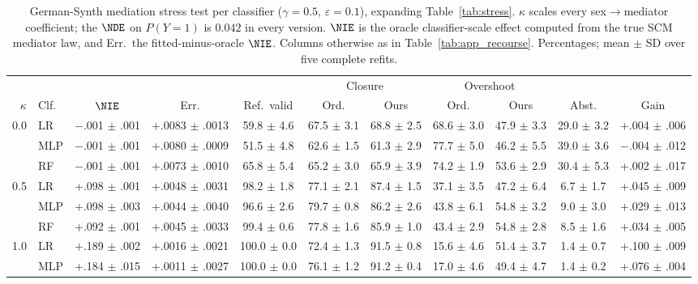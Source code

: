 \begin{table}[t]
\centering
\footnotesize
\caption{German-Synth mediation stress test per classifier ($\gamma=0.5$,
$\varepsilon=0.1$), expanding Table~\ref{tab:stress}. $\kappa$ scales every
sex$\to$mediator coefficient; the $\NDE$ on $P(Y=1)$ is $0.042$ in every
version. $\NIE$ is the oracle classifier-scale effect computed from the true
SCM mediator law, and Err.\ the fitted-minus-oracle $\NIE$. Columns otherwise
as in Table~\ref{tab:app_recourse}. Percentages; mean $\pm$ SD over five
complete refits.}
\label{tab:app_stress}
\setlength{\tabcolsep}{2.5pt}
\begin{tabular}{rl cc c cc cc c c}
\hline
& & & & & \multicolumn{2}{c}{Closure} & \multicolumn{2}{c}{Overshoot} & & \\
$\kappa$ & Clf. & $\NIE$ & Err. & Ref.\ valid & Ord. & Ours & Ord. & Ours &
Abst. & Gain \\
\hline
0.0 & LR & $-$.001 $\pm$ .001 & +.0083 $\pm$ .0013 & 59.8 $\pm$ 4.6 & 67.5 $\pm$ 3.1 & 68.8 $\pm$ 2.5 & 68.6 $\pm$ 3.0 & 47.9 $\pm$ 3.3 & 29.0 $\pm$ 3.2 & +.004 $\pm$ .006 \\
 & MLP & $-$.001 $\pm$ .001 & +.0080 $\pm$ .0009 & 51.5 $\pm$ 4.8 & 62.6 $\pm$ 1.5 & 61.3 $\pm$ 2.9 & 77.7 $\pm$ 5.0 & 46.2 $\pm$ 5.5 & 39.0 $\pm$ 3.6 & $-$.004 $\pm$ .012 \\
 & RF & $-$.001 $\pm$ .001 & +.0073 $\pm$ .0010 & 65.8 $\pm$ 5.4 & 65.2 $\pm$ 3.0 & 65.9 $\pm$ 3.9 & 74.2 $\pm$ 1.9 & 53.6 $\pm$ 2.9 & 30.4 $\pm$ 5.3 & +.002 $\pm$ .017 \\
\hline
0.5 & LR & +.098 $\pm$ .001 & +.0048 $\pm$ .0031 & 98.2 $\pm$ 1.8 & 77.1 $\pm$ 2.1 & 87.4 $\pm$ 1.5 & 37.1 $\pm$ 3.5 & 47.2 $\pm$ 6.4 & 6.7 $\pm$ 1.7 & +.045 $\pm$ .009 \\
 & MLP & +.098 $\pm$ .003 & +.0044 $\pm$ .0040 & 96.6 $\pm$ 2.6 & 79.7 $\pm$ 0.8 & 86.2 $\pm$ 2.6 & 43.8 $\pm$ 6.1 & 54.8 $\pm$ 3.2 & 9.0 $\pm$ 3.0 & +.029 $\pm$ .013 \\
 & RF & +.092 $\pm$ .001 & +.0045 $\pm$ .0033 & 99.4 $\pm$ 0.6 & 77.8 $\pm$ 1.6 & 85.9 $\pm$ 1.0 & 43.4 $\pm$ 2.9 & 54.8 $\pm$ 2.8 & 8.5 $\pm$ 1.6 & +.034 $\pm$ .005 \\
\hline
1.0 & LR & +.189 $\pm$ .002 & +.0016 $\pm$ .0021 & 100.0 $\pm$ 0.0 & 72.4 $\pm$ 1.3 & 91.5 $\pm$ 0.8 & 15.6 $\pm$ 4.6 & 51.4 $\pm$ 3.7 & 1.4 $\pm$ 0.7 & +.100 $\pm$ .009 \\
 & MLP & +.184 $\pm$ .015 & +.0011 $\pm$ .0027 & 100.0 $\pm$ 0.0 & 76.1 $\pm$ 1.2 & 91.2 $\pm$ 0.4 & 17.0 $\pm$ 4.6 & 49.4 $\pm$ 4.7 & 1.4 $\pm$ 0.2 & +.076 $\pm$ .004 \\

\end{tabular}
\end{table}
